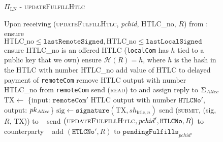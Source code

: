   \begin{figure}[H]
    \begin{protocolbox}{$\Pi_{\mathrm{LN}}$ - \textsc{updateFulfillHtlc}}
      \begin{algorithmic}[1]
        \State Upon receiving (\textsc{updateFulfillHtlc}, \textit{pchid},
        HTLC\_no, $R$) from \bob:
        \Indent
          \State ensure $\mathrm{HTLC\_no} \leq \mathtt{lastRemoteSigned},
          \mathrm{HTLC\_no} \leq \mathtt{lastLocalSigned}$
          \State ensure HTLC\_no is an offered HTLC (\texttt{localCom} has $h$
          tied to a public key that we own)
          \State ensure $\mathcal{H}\left(R\right) = h$, where $h$ is the hash
          in the HTLC with number HTLC\_no
          \State add value of HTLC to delayed payment of \texttt{remoteCom}
          \State remove HTLC output with number HTLC\_no from \texttt{remoteCom}
           
              \State send (\textsc{read}) to \ledger{} and assign reply to
              $\Sigma_{\mathit{Alice}}$
                \State $\mathrm{TX} \gets$ \{input: $\mathtt{remoteCom}'$ HTLC
                output with number $\mathtt{HTLCNo}'$, output: $pk_{\mathit{Alice}}$\}
                \State $\mathrm{sig} \gets \mathtt{signature}\left(\mathrm{TX},
                sh_{\mathrm{htlc}, n}\right)$
                \State send (\textsc{submit}, (sig, $R$, TX)) to \ledger{}
                \label{alg:protocol:pay:updateFulfillHtlc:submit}
              \Else \ 
                \State send $\left(\textsc{updateFulfillHtlc}, \mathit{pchid}',
                \mathtt{HTLCNo}, R\right)$ to counterparty
              \EndIf
            \Else \ 
              \State add $\left(\mathtt{HTLCNo}', R\right)$ to
              $\mathtt{pendingFulfills}_{\mathit{pchid}'}$
            \EndIf
          \EndIf
        \EndIndent
      \end{algorithmic}
    \end{protocolbox}
    \caption{}
    \label{alg:protocol:pay:updateFulfillHtlc}
  \end{figure}

